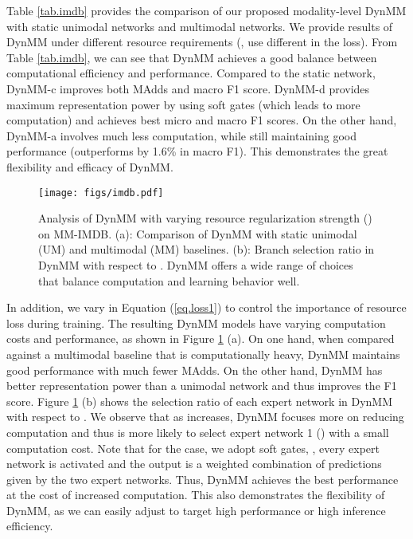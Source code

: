 Table \ref{tab.imdb} provides the comparison of our proposed modality-level DynMM with static unimodal networks and multimodal networks. We provide results of DynMM under different resource requirements (\ie, use different  in the loss). From Table \ref{tab.imdb}, we can see that DynMM achieves a good balance between computational efficiency and performance. Compared to the static  network, DynMM-c improves both MAdds and macro F1 score. DynMM-d provides maximum representation power by using soft gates (which leads to more computation) and achieves best micro and macro F1 scores. On the other hand, DynMM-a involves much less computation, while still maintaining good performance (outperforms  by 1.6\% in macro F1). This demonstrates the great flexibility and efficacy of DynMM.







\begin{figure}[!t]
  \centering
  \texttt{[image: figs/imdb.pdf]}
  \caption{Analysis of DynMM with varying resource regularization strength () on MM-IMDB. (a): Comparison of DynMM with static unimodal (UM) and multimodal (MM) baselines. (b): Branch selection ratio in DynMM with respect to . DynMM offers a wide range of choices that balance computation and learning behavior well.}
  \label{fig.imdb}
\end{figure}



In addition, we vary  in Equation (\ref{eq.loss1}) to control the importance of resource loss during training. The resulting DynMM models have varying computation costs and performance, as shown in Figure \ref{fig.imdb} (a). On one hand, when compared against a multimodal baseline that is computationally heavy, DynMM maintains good performance with much fewer MAdds. On the other hand, DynMM has better representation power than a unimodal network and thus improves the F1 score. Figure \ref{fig.imdb} (b) shows the selection ratio of each expert network in DynMM with respect to . We observe that as  increases, DynMM focuses more on reducing computation and thus is more likely to select expert network 1 () with a small computation cost. Note that for the  case, we adopt soft gates, \ie, every expert network is activated and the output is a weighted combination of predictions given by the two expert networks. Thus, DynMM achieves the best performance at the cost of increased computation. This also demonstrates the flexibility of DynMM, as we can easily adjust  to target high performance or high inference efficiency. 

